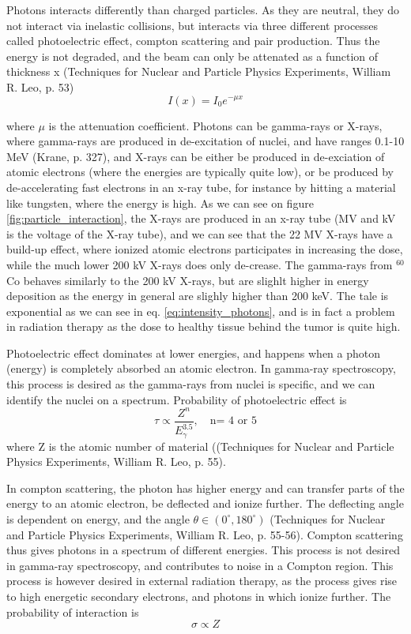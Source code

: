 Photons interacts differently than charged particles. As they are neutral, they do not interact via inelastic collisions, but interacts via three different processes called photoelectric effect, compton scattering and pair production. Thus the energy is not degraded, and the beam can only be attenated as a function of thickness x (Techniques for Nuclear and Particle Physics Experiments, William R. Leo, p. 53)
\begin{equation} \label{eq:intensity_photons}
    I(x) = I_0 e^{-\mu x}
\end{equation}

where $\mu$ is the attenuation coefficient. Photons can be gamma-rays or X-rays, where gamma-rays are produced in de-excitation of nuclei, and have ranges 0.1-10 MeV (Krane, p. 327), and X-rays can be either be produced in de-exciation of atomic electrons (where the energies are typically quite low), or be produced by de-accelerating fast electrons in an x-ray tube, for instance by hitting a material like tungsten, where the energy is high. As we can see on figure \ref{fig:particle_interaction}, the X-rays are produced in an x-ray tube (MV and kV is the voltage of the X-ray tube), and we can see that the 22 MV X-rays have a build-up effect, where ionized atomic electrons participates in increasing the dose, while the much lower 200 kV X-rays does only de-crease. The gamma-rays from $^{60}$Co behaves similarly to the 200 kV X-rays, but are slighlt higher in energy deposition as the energy in general are slighly higher than 200 keV. The tale is exponential as we can see in eq. \ref{eq:intensity_photons}, and is in fact a problem in radiation therapy as the dose to healthy tissue behind the tumor is quite high. 

Photoelectric effect dominates at lower energies, and happens when a photon (energy) is completely absorbed an atomic electron. In gamma-ray spectroscopy, this process is desired as the gamma-rays from nuclei is specific, and we can identify the nuclei on a spectrum. Probability of photoelectric effect is \begin{equation}
    \tau \propto \frac{Z^n}{E_\gamma^{3.5}}, \quad \text{n= 4 or 5}
\end{equation}
where Z is the atomic number of material ((Techniques for Nuclear and Particle Physics Experiments, William R. Leo, p. 55). 

In compton scattering, the photon has higher energy and can transfer parts of the energy to an atomic electron, be deflected and ionize further. The deflecting angle is dependent on energy, and the angle $\theta\in (0^\circ, 180^\circ)$ (Techniques for Nuclear and Particle Physics Experiments, William R. Leo, p. 55-56). Compton scattering thus gives photons in a spectrum of different energies. This process is not desired in gamma-ray spectroscopy, and contributes to noise in a Compton region. This process is however desired in external radiation therapy, as the process gives rise to high energetic secondary electrons, and photons in which ionize further. The probability of interaction is 
\begin{equation}
    \sigma \propto Z
\end{equation}

